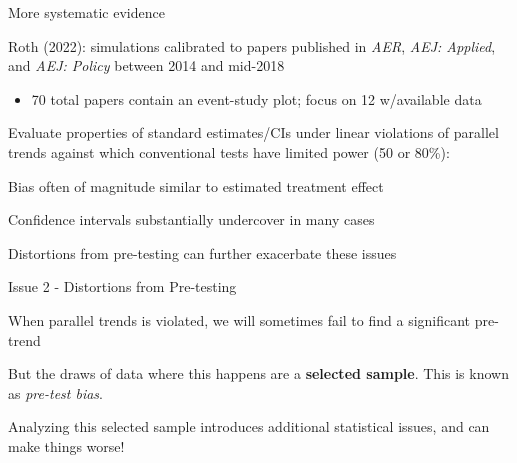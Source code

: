 \documentclass[aspectratio = 169, 13pt]{beamer}
\begin{document}
\begin{frame}[label = roth sims]{More systematic evidence}
	
	\begin{wideitemize}
		
		\item
		Roth (2022): simulations calibrated to papers published in \textit{AER}, \textit{AEJ: Applied}, and \textit{AEJ: Policy} between 2014 and mid-2018  
		\begin{itemize}
			\item
			      70 total papers contain an event-study plot; focus on 12 w/available data
		\end{itemize}
		
		\item
		Evaluate properties of standard estimates/CIs under linear violations of parallel trends against which conventional tests have limited power (50 or 80\%):
		
		\begin{enumerate}
			\normalsize{
				\item
				Bias often of magnitude similar to estimated treatment effect
				    
				\item
				Confidence intervals substantially undercover in many cases
				    
				\item
				Distortions from pre-testing can further exacerbate these issues
			}
		\end{enumerate}
	\end{wideitemize}
	
\end{frame}

\begin{frame}{Issue 2 - Distortions from Pre-testing}
	\begin{wideitemize}
		\item
		When parallel trends is violated, we will sometimes fail to find a significant pre-trend
		
		\item
		But the draws of data where this happens are a \textbf{selected sample}. This is known as \textit{pre-test bias}.
		
		\item
		Analyzing this selected sample introduces additional statistical issues, and can make things worse!
		
	\end{wideitemize}
\end{frame}
\end{document}
